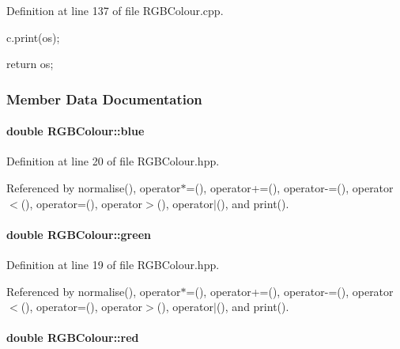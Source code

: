 \-Definition at line 137 of file \-R\-G\-B\-Colour.\-cpp.


\begin{DoxyCode}
{

    c.print(os);

    return os;
}
\end{DoxyCode}


\subsubsection{\-Member \-Data \-Documentation}
\hypertarget{classRGBColour_a60f32f30efb99da74e903b3876b6f161}{
\paragraph[{blue}]{\setlength{\rightskip}{0pt plus 5cm}double {\bf \-R\-G\-B\-Colour\-::blue}}}\label{classRGBColour_a60f32f30efb99da74e903b3876b6f161}


\-Definition at line 20 of file \-R\-G\-B\-Colour.\-hpp.



\-Referenced by normalise(), operator$\ast$=(), operator+=(), operator-\/=(), operator$<$(), operator=(), operator$>$(), operator$|$(), and print().

\hypertarget{classRGBColour_a5530e8f8b209d95c3b2c3127c62676e1}{
\paragraph[{green}]{\setlength{\rightskip}{0pt plus 5cm}double {\bf \-R\-G\-B\-Colour\-::green}}}\label{classRGBColour_a5530e8f8b209d95c3b2c3127c62676e1}


\-Definition at line 19 of file \-R\-G\-B\-Colour.\-hpp.



\-Referenced by normalise(), operator$\ast$=(), operator+=(), operator-\/=(), operator$<$(), operator=(), operator$>$(), operator$|$(), and print().

\hypertarget{classRGBColour_a459ad477ba571d1749e68c5d57869913}{
\paragraph[{red}]{\setlength{\rightskip}{0pt plus 5cm}double {\bf \-R\-G\-B\-Colour\-::red}}}\label{classRGBColour_a459ad477ba571d1749e68c5d57869913}


